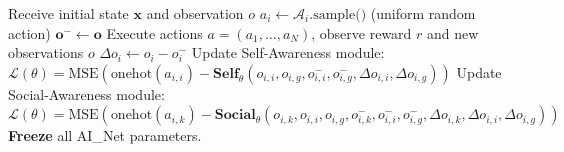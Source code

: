\documentclass[12pt]{article}
\begin{document}
\begin{algorithm}[H]
\caption{Pre-Training the AI\_Net (PTAI) on random episodes}
\label{alg:ptai}
\begin{algorithmic}[1]
  \State Receive initial state $\mathbf{x}$ and observation $o$
      \State $a_i \leftarrow \mathcal{A}_i.\text{sample()}$ \quad (uniform random action)
    \EndFor
    \State $\mathbf{o}^- \leftarrow \mathbf{o}$
    \State Execute actions $a = (a_1, \ldots, a_N)$, observe reward $r$ and new observations $o$
      \State $\Delta o_i \leftarrow o_i - o^-_i$
          \State Update Self-Awareness module:
                 $\mathcal{L}(\theta) = \text{MSE}(\text{onehot}(a_{i,i}) - \mathbf{Self}_\theta(o_{i,i}, o_{i,g}, o^-_{i,i}, o^-_{i,g}, \Delta o_{i,i}, \Delta o_{i,g}))$
        \Else
          \State Update Social-Awareness module:
                 $\mathcal{L}(\theta) = \text{MSE}(\text{onehot}(a_{i,k}) - \mathbf{Social}_\theta(o_{i,k}, o_{i,i}, o_{i,g}, o^-_{i,k}, o^-_{i,i}, o^-_{i,g}, \Delta o_{i,k}, \Delta o_{i,i}, \Delta o_{i,g}))$
        \EndIf
      \EndFor
    \EndFor
  \EndFor
\EndFor
\State \textbf{Freeze} all AI\_Net parameters.
\end{algorithmic}
\end{algorithm}
\end{document}
